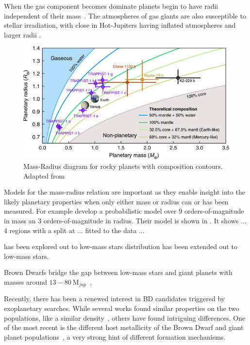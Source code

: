 When the gas component becomes dominate  planets begin to have radii independent of their mass~\citep[e.g.][]{lopez_understanding_2014}.
The atmospheres of gas giants are also susceptible to stellar irradiation, with close in Hot-Jupiters having inflated atmospheres and larger radii \citep[e.g][]{fortney_interior_2010}. 

\begin{figure}
    \centering
    \includegraphics[width=0.7\linewidth]{figures/introduction/santerne_2018}
    \caption{Mass-Radius diagram for rocky planets with composition contours. Adapted from \citet{santerne_earthsized_2018}}
    \label{fig:santerne2018}
\end{figure}



Models for the mass-radius relation are important as they enable insight into the likely planetary properties when only either mass or radius can or has been measured.
For example \citet{chen_probabilistic_2016} develop a probabilistic model over 9 orders-of-magnitude in mass an 3 orders-of-magnitude in radius.
Their model is shown in .
It shows ... 4 regions with a split at ... fitted to the data ...

 has been explored out to low-mass stars distribution has been extended out to low-mass stars. 



Brown Dwarfs bridge the gap between low-mass stars and giant planets with masses around \(13-80~\textrm{M}_{jup} \)~\citep{chabrier_theory_2000}, 



Recently, there has been a renewed interest in BD candidates triggered by exoplanetary searches.
While several works found similar properties on the two populations, like a similar density~\citep{hatzes_definition_2015}, others have found intriguing differences.
One of the most recent is the different host metallicity of the Brown Dwarf and giant planet populations~\citep{santos_observational_2017, schlaufman_evidence_2018}, a very strong hint of different formation mechanisms.


